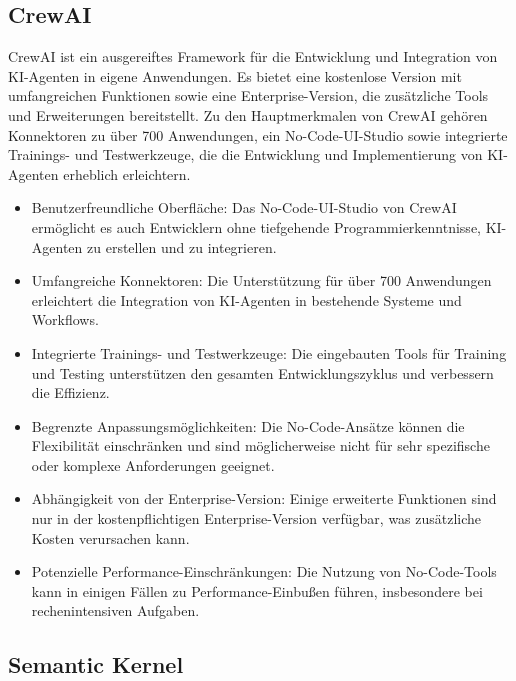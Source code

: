 \subsection{CrewAI}\cite{crewai}

CrewAI ist ein ausgereiftes Framework für die Entwicklung und Integration von KI-Agenten in eigene Anwendungen. Es bietet eine kostenlose Version mit umfangreichen Funktionen sowie eine Enterprise-Version, die zusätzliche Tools und Erweiterungen bereitstellt. Zu den Hauptmerkmalen von CrewAI gehören Konnektoren zu über 700 Anwendungen, ein No-Code-UI-Studio sowie integrierte Trainings- und Testwerkzeuge, die die Entwicklung und Implementierung von KI-Agenten erheblich erleichtern.

\begin{itemize}
    \item Benutzerfreundliche Oberfläche: Das No-Code-UI-Studio von CrewAI ermöglicht es auch Entwicklern ohne tiefgehende Programmierkenntnisse, KI-Agenten zu erstellen und zu integrieren.

    \item Umfangreiche Konnektoren: Die Unterstützung für über 700 Anwendungen erleichtert die Integration von KI-Agenten in bestehende Systeme und Workflows.

    \item Integrierte Trainings- und Testwerkzeuge: Die eingebauten Tools für Training und Testing unterstützen den gesamten Entwicklungszyklus und verbessern die Effizienz.
\end{itemize}

\begin{itemize}
    \item Begrenzte Anpassungsmöglichkeiten: Die No-Code-Ansätze können die Flexibilität einschränken und sind möglicherweise nicht für sehr spezifische oder komplexe Anforderungen geeignet.

    \item Abhängigkeit von der Enterprise-Version: Einige erweiterte Funktionen sind nur in der kostenpflichtigen Enterprise-Version verfügbar, was zusätzliche Kosten verursachen kann.

    \item Potenzielle Performance-Einschränkungen: Die Nutzung von No-Code-Tools kann in einigen Fällen zu Performance-Einbußen führen, insbesondere bei rechenintensiven Aufgaben.
\end{itemize}

\subsection{Semantic Kernel}\cite{microsoft_semantic_kernel_agent_framework}

